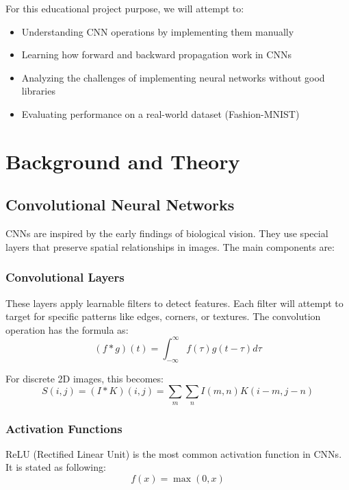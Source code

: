 \documentclass[conference]{IEEEtran}
\begin{document}
For this educational project purpose, we will attempt to:
\begin{itemize}
    \item Understanding CNN operations by implementing them manually
    \item Learning how forward and backward propagation work in CNNs
    \item Analyzing the challenges of implementing neural networks without good libraries
    \item Evaluating performance on a real-world dataset (Fashion-MNIST)
\end{itemize}

\section{Background and Theory}

\subsection{Convolutional Neural Networks}
CNNs are inspired by the early findings of biological vision. They use special layers that preserve spatial relationships in images. The main components are:

\subsubsection{Convolutional Layers}
These layers apply learnable filters to detect features. Each filter will attempt to target for specific patterns like edges, corners, or textures. The convolution operation has the formula as:
\begin{equation}
    (f * g)(t) = \int_{-\infty}^{\infty} f(\tau)g(t-\tau)d\tau
\end{equation}

For discrete 2D images, this becomes:
\begin{equation}
    S(i,j) = (I * K)(i,j) = \sum_m \sum_n I(m,n)K(i-m,j-n)
\end{equation}

\subsubsection{Activation Functions}
ReLU (Rectified Linear Unit) is the most common activation function in CNNs. It is stated as following:
\begin{equation}
    f(x) = \max(0, x)
\end{equation}
\end{document}
